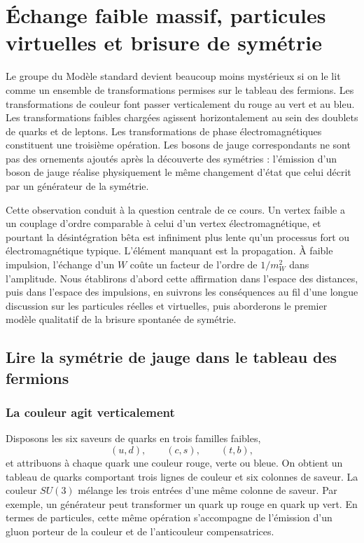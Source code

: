 \chapter{Échange faible massif, particules virtuelles et brisure de symétrie}

Le groupe du Modèle standard devient beaucoup moins mystérieux si on le lit comme un ensemble de transformations permises sur le tableau des fermions. Les transformations de couleur font passer verticalement du rouge au vert et au bleu. Les transformations faibles chargées agissent horizontalement au sein des doublets de quarks et de leptons. Les transformations de phase électromagnétiques constituent une troisième opération. Les bosons de jauge correspondants ne sont pas des ornements ajoutés après la découverte des symétries : l’émission d’un boson de jauge réalise physiquement le même changement d’état que celui décrit par un générateur de la symétrie.

Cette observation conduit à la question centrale de ce cours. Un vertex faible a un couplage d’ordre comparable à celui d’un vertex électromagnétique, et pourtant la désintégration bêta est infiniment plus lente qu’un processus fort ou électromagnétique typique. L’élément manquant est la propagation. À faible impulsion, l’échange d’un \(W\) coûte un facteur de l’ordre de \(1/m_W^2\) dans l’amplitude. Nous établirons d’abord cette affirmation dans l’espace des distances, puis dans l’espace des impulsions, en suivrons les conséquences au fil d’une longue discussion sur les particules réelles et virtuelles, puis aborderons le premier modèle qualitatif de la brisure spontanée de symétrie.

\section{Lire la symétrie de jauge dans le tableau des fermions}

\subsection{La couleur agit verticalement}

Disposons les six saveurs de quarks en trois familles faibles,
\begin{equation}
  (u,d),\qquad(c,s),\qquad(t,b),
\end{equation}
et attribuons à chaque quark une couleur rouge, verte ou bleue. On obtient un tableau de quarks comportant trois lignes de couleur et six colonnes de saveur. La couleur \(SU(3)\) mélange les trois entrées d’une même colonne de saveur. Par exemple, un générateur peut transformer un quark up rouge en quark up vert. En termes de particules, cette même opération s’accompagne de l’émission d’un gluon porteur de la couleur et de l’anticouleur compensatrices.

